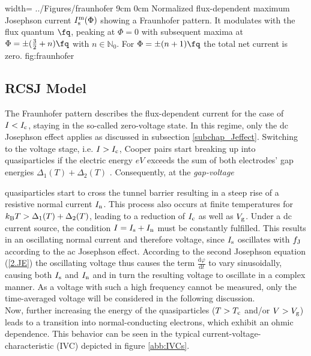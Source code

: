 {width=\textwidth}
{../Figures/fraunhofer}
{9cm}
{0cm}
{Normalized flux-dependent maximum Josephson current $I_{\rm s}^{\rm m}(\Phi)$ showing a Fraunhofer pattern. It modulates with the flux quantum $\unit{\fq}$, peaking at $\Phi=0$ with subsequent maxima at $\Phi=\pm(\frac{3}{2}+n)\unit{\fq}$ with $n\in\mathbb{N}_0$. For $\Phi=\pm(n+1)\unit{\fq}$ the total net current is zero.} 
{fig:fraunhofer}


\subsection{RCSJ Model}\label{subsec_RCSJ}

The Fraunhofer pattern describes the flux-dependent current for the case of $I<I_{\rm c}$, staying in the so-called zero-voltage state. In this regime, only the dc Josephson effect applies as discussed in subsection \ref{subchap_Jeffect}. Switching to the voltage stage, i.e. $I>I_{\rm c}$, Cooper pairs start breaking up into quasiparticles if the electric energy $eV$ exceeds the sum of both electrodes' gap energies $\Delta_1(T) + \Delta_2(T)$ \cite{Bardeen1957}. Consequently, at the \textit{gap-voltage} 


quasiparticles start to cross the tunnel barrier resulting in a steep rise of a resistive normal current $I_{\rm n}$. This process also occurs at finite temperatures for $k_{\rm B}T>\Delta_1(T) + \Delta_2(T)$, leading to a reduction of $I_{\rm c}$ as well as $V_{\rm g}$. Under a dc current source, the condition $I=I_{\rm s}+I_{\rm n}$ must be constantly fulfilled. This results in an oscillating normal current and therefore voltage, since $I_{\rm s}$ oscillates with $f_{\rm J}$ according to the ac Josephson effect. According to the second Josephson equation (\ref{2.JE}) the oscillating voltage thus causes the term $\frac{\mathrm{d}\varphi}{\mathrm{d}t}$ to vary sinusoidally, causing both $I_{\rm s}$ and $I_{\rm n}$ and in turn the resulting voltage to oscillate in a complex manner. As a voltage with such a high frequency cannot be measured, only the time-averaged voltage will be considered in the following discussion. \\
Now, further increasing the energy of the quasiparticles ($T>T_{\rm c}$ and/or $V>V_{\rm g}$) leads to a transition into normal-conducting electrons, which exhibit an ohmic dependence. This behavior can be seen in the typical current-voltage-characteristic (IVC) depicted in figure \ref{abb:IVCs}. \\ 

